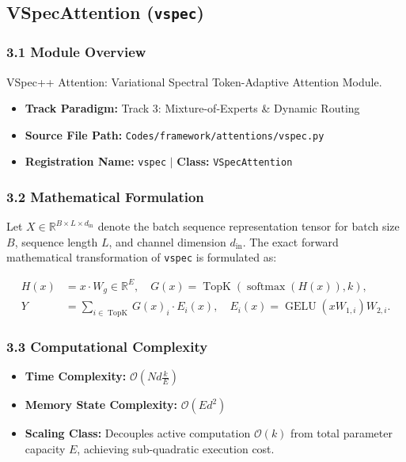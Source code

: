 \subsection{VSpecAttention (\texttt{vspec})}
\label{sec:app_module_vspec}

\subsubsection*{3.1 Module Overview}
VSpec++ Attention: Variational Spectral Token-Adaptive Attention Module.
\begin{itemize}
    \item \textbf{Track Paradigm:} Track 3: Mixture-of-Experts & Dynamic Routing
    \item \textbf{Source File Path:} \texttt{Codes/framework/attentions/vspec.py}
    \item \textbf{Registration Name:} \texttt{vspec} $\mid$ \textbf{Class:} \texttt{VSpecAttention}
\end{itemize}

\subsubsection*{3.2 Mathematical Formulation}
Let $X \in \mathbb{R}^{B \times L \times d_{\text{in}}}$ denote the batch sequence representation tensor for batch size $B$, sequence length $L$, and channel dimension $d_{\text{in}}$. The exact forward mathematical transformation of \texttt{vspec} is formulated as:

\begin{align}
H(x) &= x \cdot W_g \in \mathbb{R}^{E}, \quad G(x) = \operatorname{TopK}\left(\operatorname{softmax}(H(x)), k\right), \\
Y &= \sum_{i \in \operatorname{TopK}} G(x)_i \cdot E_i(x), \quad E_i(x) = \operatorname{GELU}(x W_{1, i}) W_{2, i}.
\end{align}


\subsubsection*{3.3 Computational Complexity}
\begin{itemize}
    \item \textbf{Time Complexity:} $\mathcal{O}(N d \frac{k}{E})$
    \item \textbf{Memory State Complexity:} $\mathcal{O}(E d^2)$
    \item \textbf{Scaling Class:} Decouples active computation $\mathcal{O}(k)$ from total parameter capacity $E$, achieving sub-quadratic execution cost.
\end{itemize}

